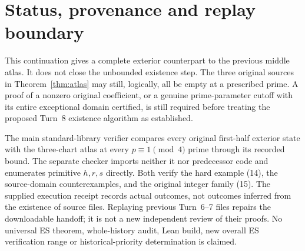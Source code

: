 \section{Status, provenance and replay boundary}
This continuation gives a complete exterior counterpart to the previous middle
atlas. It does not close the unbounded existence step. The three original
sources in Theorem~\ref{thm:atlas} may still, logically, all be empty at a
prescribed prime. A proof of a nonzero original coefficient, or a genuine
prime-parameter cutoff with its entire exceptional domain certified, is still
required before treating the proposed Turn~8 existence algorithm as established.

The main standard-library verifier compares every original first-half exterior
state with the three-chart atlas at every $p\equiv1\pmod4$ prime through its
recorded bound. The separate checker imports neither it nor predecessor code
and enumerates primitive $h,r,s$ directly. Both verify the hard example (14),
the source-domain counterexamples, and the original integer family (15).
The supplied execution receipt records actual outcomes, not outcomes inferred
from the existence of source files. Replaying previous Turn~6--7 files repairs
the downloadable handoff; it is not a new independent review of their proofs.
No universal ES theorem, whole-history audit, Lean build, new overall ES
verification range or historical-priority determination is claimed.
